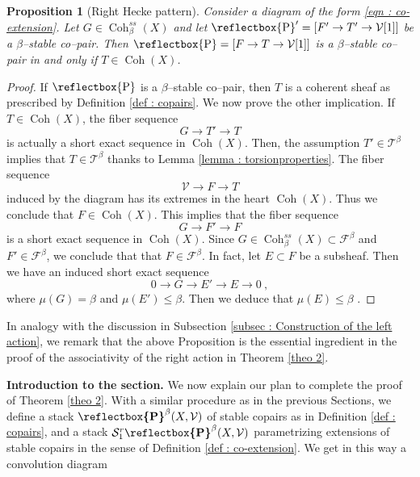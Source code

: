 \documentclass[11pt]{article}
\newtheorem{proposition}[theorem]{Proposition}
\newcommand{\segal}{\mathcal{S}}
\newcommand{\fbeta}{\mathcal{F}^{\beta}}
\newcommand{\tbeta}{\mathcal{T}^{\beta}}
\newcommand{\coh}{\operatorname{Coh}}
\newcommand{\cohbetass}{\operatorname{Coh}^{ss}_{\beta}(X)}
\newcommand{\framing}{\mathcal{V}}
\newcommand{\copairs}{\boldsymbol{\cop}^{\beta}(X,\mathcal{V})}
\newcommand{\cop}{\reflectbox{\ensuremath{\operatorname{P}}}}
\begin{document}
\begin{proposition}[Right Hecke pattern]\label{prop : righthecke}
     Consider a diagram of the form \eqref{eqn : co-extension}. Let $G\in \cohbetass$ and let $\cop' = [F' \rightarrow T'\rightarrow \framing[1]]$ be a $\beta$--stable co--pair. Then $\cop = [F \rightarrow T \rightarrow \framing[1]]$ is a $\beta$--stable co--pair in and only if $T \in \coh(X)$.
\end{proposition}
\begin{proof} If $\cop$ is a $\beta$--stable co--pair, then $T$ is a coherent sheaf as prescribed by Definition \ref{def : copairs}. We now prove the other implication. If $T\in \coh(X)$, the fiber sequence 
    \[
        G \rightarrow T' \rightarrow T
    \]
is actually a short exact sequence in $\coh(X)$. Then, the assumption $T'\in \tbeta$ implies that $T\in \tbeta$ thanks to Lemma \ref{lemma : torsionproperties}. The fiber sequence
\[
    \framing \rightarrow F \rightarrow T
\]
induced by the diagram has its extremes in the heart $\coh(X)$. Thus we conclude that $F\in \coh(X)$. This implies that the fiber sequence
\[
    G \rightarrow F'\rightarrow  F
\]
is a short exact sequence in $\coh(X)$. Since $G\in \cohbetass\subset \fbeta$ and $F'\in \fbeta$, we conclude that that $F\in \fbeta$. In fact, let $E\subset F$ be a subsheaf. Then we have an induced short exact sequence 
\[
    0\rightarrow G \rightarrow E'\rightarrow E \rightarrow 0 \ ,
\]
where $\mu(G) = \beta$ and $\mu(E') \leq \beta$. Then we deduce that $\mu(E) \leq \beta$ .
\end{proof}
\noindent In analogy with the discussion in Subsection \ref{subsec : Construction of the left action}, we remark that the above Proposition is the essential ingredient in the proof of the associativity of the right action in Theorem \ref{theo 2}.

\bigskip

\noindent\textbf{Introduction to the section. }We now explain our plan to complete the proof of Theorem \ref{theo 2}. With a similar procedure as in the previous Sections, we define a stack $\copairs$ of stable copairs as in Definition \ref{def : copairs}, and a stack $\segal^r_1\copairs$ parametrizing extensions of stable copairs in the sense of Definition \ref{def : co-extension}. We get in this way a convolution diagram
\end{document}
